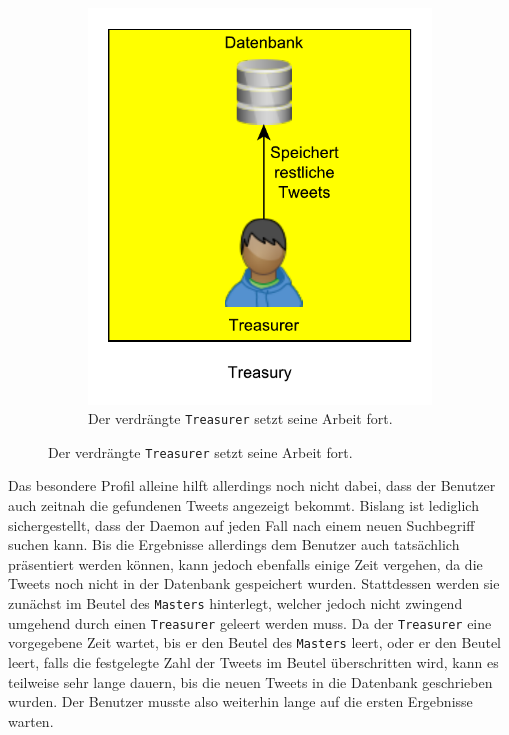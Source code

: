 \begin{figure}[h!]
\begin{subfigure}[t]{0.3\textwidth}
\includegraphics[width=\textwidth]{Bilder/Daemon/RoyalTreasurer3.pdf}
\caption{Der verdrängte \texttt{Treasurer} setzt seine Arbeit fort.}
\label{fig:royal_treasurer3}
\end{subfigure}
\end{figure}

Das besondere Profil alleine hilft allerdings noch nicht dabei, dass der Benutzer auch zeitnah die gefundenen Tweets angezeigt bekommt.
Bislang ist lediglich sichergestellt, dass der Daemon auf jeden Fall nach einem neuen Suchbegriff suchen kann.
Bis die Ergebnisse allerdings dem Benutzer auch tatsächlich präsentiert werden können, kann jedoch ebenfalls einige Zeit vergehen, da die Tweets noch nicht in der Datenbank gespeichert wurden.
Stattdessen werden sie zunächst im Beutel des \texttt{Masters} hinterlegt, welcher jedoch nicht zwingend umgehend durch einen \texttt{Treasurer} geleert werden muss.
Da der \texttt{Treasurer} eine vorgegebene Zeit wartet, bis er den Beutel des \texttt{Masters} leert, oder er den Beutel leert, falls die festgelegte Zahl der Tweets im Beutel überschritten wird, kann es teilweise sehr lange dauern, bis die neuen Tweets in die Datenbank geschrieben wurden.
Der Benutzer musste also weiterhin lange auf die ersten Ergebnisse warten.

